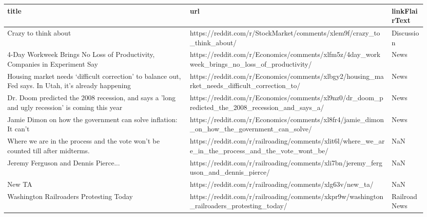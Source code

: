 \documentclass{article}%
\begin{document}
\begin{table}[htbp]%
\centering%
\begin{adjustbox}{width=1\textwidth}%
\begin{tabular}{lll}
\toprule
                                                                                                title &                                                                                                url & linkFlairText \\
\midrule
                                                                                 Crazy to think about &                             https://reddit.com/r/StockMarket/comments/xlem9f/crazy\_to\_think\_about/ &    Discussion \\
                           4-Day Workweek Brings No Loss of Productivity, Companies in Experiment Say &       https://reddit.com/r/Economics/comments/xlfm5z/4day\_workweek\_brings\_no\_loss\_of\_productivity/ &          News \\
Housing market needs ‘difficult correction’ to balance out, Fed says. In Utah, it’s already happening &       https://reddit.com/r/Economics/comments/xlbgy2/housing\_market\_needs\_difficult\_correction\_to/ &          News \\
      Dr. Doom predicted the 2008 recession, and says a 'long and ugly recession' is coming this year &    https://reddit.com/r/Economics/comments/xl9nz0/dr\_doom\_predicted\_the\_2008\_recession\_and\_says\_a/ &          News \\
                                      Jamie Dimon on how the government can solve inflation: It can't &        https://reddit.com/r/Economics/comments/xl8fr4/jamie\_dimon\_on\_how\_the\_government\_can\_solve/ &          News \\
                       Where we are in the process and the vote won’t be counted till after midterms. & https://reddit.com/r/railroading/comments/xlit6l/where\_we\_are\_in\_the\_process\_and\_the\_vote\_wont\_be/ &           NaN \\
                                                                 Jeremy Ferguson and Dennis Pierce... &                https://reddit.com/r/railroading/comments/xli7bn/jeremy\_ferguson\_and\_dennis\_pierce/ &           NaN \\
                                                                                               New TA &                                           https://reddit.com/r/railroading/comments/xlg63v/new\_ta/ &           NaN \\
                                                              Washington Railroaders Protesting Today &          https://reddit.com/r/railroading/comments/xkpr9w/washington\_railroaders\_protesting\_today/ & Railroad News \\
\bottomrule
\end{tabular}
%
\end{adjustbox}%
\end{table}

%
\end{document}
